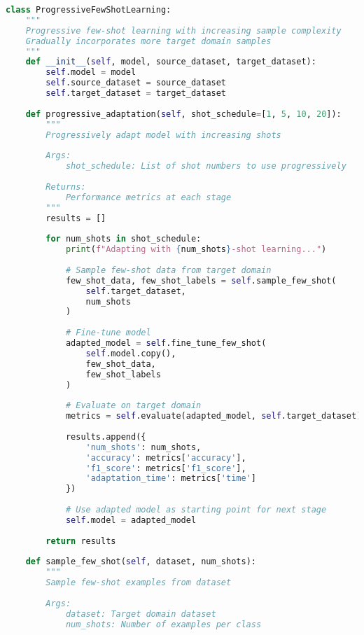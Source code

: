 \documentclass[journal]{IEEEtran}
\begin{document}
\begin{lstlisting}[language=Python, caption=Progressive Few-Shot Learning Strategy]
class ProgressiveFewShotLearning:
    """
    Progressive few-shot learning with increasing sample complexity
    Gradually incorporates more target domain samples
    """
    def __init__(self, model, source_dataset, target_dataset):
        self.model = model
        self.source_dataset = source_dataset
        self.target_dataset = target_dataset
        
    def progressive_adaptation(self, shot_schedule=[1, 5, 10, 20]):
        """
        Progressively adapt model with increasing shots
        
        Args:
            shot_schedule: List of shot numbers to use progressively
        
        Returns:
            Performance metrics at each stage
        """
        results = []
        
        for num_shots in shot_schedule:
            print(f"Adapting with {num_shots}-shot learning...")
            
            # Sample few-shot data from target domain
            few_shot_data, few_shot_labels = self.sample_few_shot(
                self.target_dataset, 
                num_shots
            )
            
            # Fine-tune model
            adapted_model = self.fine_tune_few_shot(
                self.model.copy(),
                few_shot_data,
                few_shot_labels
            )
            
            # Evaluate on target domain
            metrics = self.evaluate(adapted_model, self.target_dataset)
            
            results.append({
                'num_shots': num_shots,
                'accuracy': metrics['accuracy'],
                'f1_score': metrics['f1_score'],
                'adaptation_time': metrics['time']
            })
            
            # Use adapted model as starting point for next stage
            self.model = adapted_model
        
        return results
    
    def sample_few_shot(self, dataset, num_shots):
        """
        Sample few-shot examples from dataset
        
        Args:
            dataset: Target domain dataset
            num_shots: Number of examples per class
        

\end{lstlisting}
\end{document}
